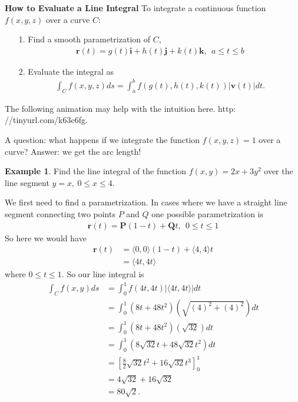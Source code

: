 \documentclass[12pt, letter]{article}
\theoremstyle{plain}
\numberwithin{theorem}{section}
\theoremstyle{definition}
\newtheorem{example}[theorem]{Example}
\begin{document}
\bigskip

\hrulefill

\bigskip

\textbf{How to Evaluate a Line Integral}
To integrate a continuous function $f(x,y,z)$ over a curve $C$:
\begin{itemize}
\item[1.] Find a smooth parametrization of $C$,
\begin{align*}
\bm{r}(t) = g(t)\bm{i}+h(t)\bm{j}+k(t)\bm{k}, \ \ a\leq t \leq b
\end{align*}
\item[2.] Evaluate the integral as
\begin{align*}
\int_C f(x,y,z)ds = \int_a^b f(g(t),h(t),k(t))|\bm{v}(t)|dt.
\end{align*}
\end{itemize}

\bigskip

\hrulefill

\bigskip

The following animation may help with the intuition here.
http: //tinyurl.com/k63c6fg.

\bigskip

\hrulefill

\bigskip

A question: what happens if we integrate the function $f(x,y,z) = 1$ over a curve? Answer: we get the arc length!

\bigskip

\hrulefill

\bigskip

\begin{example}
Find the line integral of the function $f(x,y) = 2x+3y^2$ over the line segment $y=x, \ 0\leq x \leq 4$.

\smallskip

We first need to find a parametrization. In cases where we have a straight line segment connecting two points $P$ and $Q$ one possible parametrization is
\begin{align*}
\bm{r}(t) = \bm{P}(1-t)+\bm{Q}t, \ \ 0\leq t \leq 1
\end{align*}
So here we would have
\begin{align*}
\bm{r}(t) &= \langle 0,0 \rangle(1-t) + \langle 4,4 \rangle t\\
&= \langle 4t, 4t \rangle
\end{align*}
where $0\leq t \leq 1$. So our line integral is
\begin{align*}
\int_C f(x,y) ds &= \int_0^1 f(4t,4t) |\langle 4t, 4t \rangle| dt\\
&= \int_0^1 (8t+48t^2)\left(\sqrt{(4)^2+(4)^2}\right)dt\\
&= \int_0^1 (8t+48t^2)(\sqrt{32})dt\\
&= \int_0^1 (8\sqrt{32}t+48\sqrt{32}t^2)dt\\
&= \left[\frac{8}{2}\sqrt{32}t^2+16\sqrt{32}t^3\right]_0^1\\
&=4\sqrt{32}+16\sqrt{32}\\
&=80\sqrt{2}.
\end{align*}
\end{example}
\end{document}
